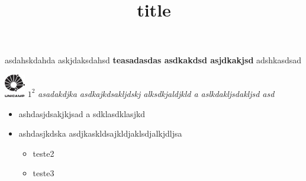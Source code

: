\documentclass{article}
\title{title}
\begin{document}
\maketitle

asdahskdahda askjdaksdahsd
\textbf{teasadasdas asdkakdsd asjdkakjsd} adshkasdsad

 \includegraphics{teste.jpg}
 $ 1^2 $
\textit{ asadakdjka asdkajkdsakljdskj
    alksdkjaldjkld a
        aslkdakljsdakljsd asd}
        \begin{itemize}
        \item ashdasjdsakjkjsad
        a sdklasdklasjkd
        \item ashdasjkdska
        asdjkaskldsajkldjaklsdjalkjdljsa
        \begin{itemize}
        \item teste2
        \item teste3
        \end{itemize}
        \end{itemize}
\end{document}
